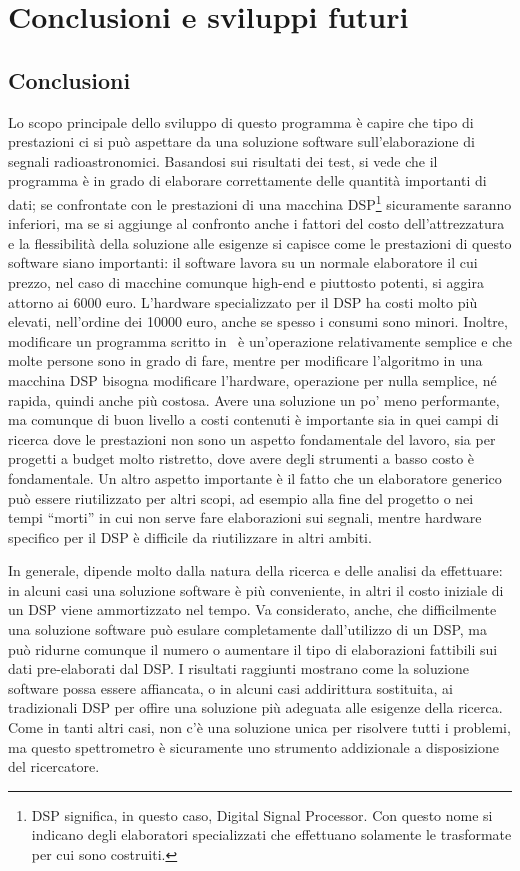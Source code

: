\chapter{Conclusioni e sviluppi futuri}
\label{conclusions}
\section{Conclusioni}
Lo scopo principale dello sviluppo di questo programma \`e capire che tipo di
prestazioni ci si pu\`o aspettare da una soluzione software sull'elaborazione di
segnali radioastronomici. Basandosi sui risultati dei test, si vede che il
programma \`e in grado di elaborare correttamente delle quantit\`a importanti di
dati; se confrontate con le prestazioni di una macchina DSP\footnote{DSP
    significa, in questo caso, Digital Signal Processor. Con questo nome si
    indicano degli elaboratori specializzati che effettuano solamente le
    trasformate per cui sono costruiti.} sicuramente saranno inferiori, ma se si
aggiunge al confronto anche i fattori del costo dell'attrezzatura e la
flessibilit\`a della soluzione alle esigenze si capisce come le prestazioni di
questo software siano importanti: il software lavora su un normale elaboratore
il cui prezzo, nel caso di macchine comunque high-end e piuttosto potenti, si
aggira attorno ai 6000 euro. L'hardware specializzato per il DSP ha costi molto
pi\`u elevati, nell'ordine dei 10000 euro, anche se spesso i consumi sono
minori. Inoltre, modificare un programma scritto in \CC\, \`e un'operazione
relativamente semplice e che molte persone sono in grado di fare, mentre per
modificare l'algoritmo in una macchina DSP bisogna modificare l'hardware,
operazione per nulla semplice, n\'e rapida, quindi anche pi\`u costosa. Avere
una soluzione un po' meno performante, ma comunque di buon livello a costi
contenuti \`e importante sia in quei campi di ricerca dove le prestazioni non
sono un aspetto fondamentale del lavoro, sia per progetti a budget molto
ristretto, dove avere degli strumenti a basso costo \`e fondamentale.
Un altro aspetto importante \`e il fatto che un elaboratore generico pu\`o
essere riutilizzato per altri scopi, ad esempio alla fine del progetto o nei
tempi ``morti'' in cui non serve fare elaborazioni sui segnali, mentre hardware
specifico per il DSP \`e difficile da riutilizzare in altri ambiti.

In generale, dipende molto dalla natura della ricerca e delle analisi da
effettuare: in alcuni casi una soluzione software \`e pi\`u conveniente, in
altri il costo iniziale di un DSP viene ammortizzato nel tempo. Va considerato,
anche, che difficilmente una soluzione software pu\`o esulare completamente
dall'utilizzo di un DSP, ma pu\`o ridurne comunque il numero o aumentare il tipo
di elaborazioni fattibili sui dati pre-elaborati dal DSP. I risultati raggiunti
mostrano come la soluzione software possa essere affiancata, o in alcuni casi
addirittura sostituita, ai tradizionali DSP per offire una soluzione pi\`u
adeguata alle esigenze della ricerca. Come in tanti altri casi, non c'\`e una
soluzione unica per risolvere tutti i problemi, ma questo spettrometro \`e
sicuramente uno strumento addizionale a disposizione del ricercatore.

